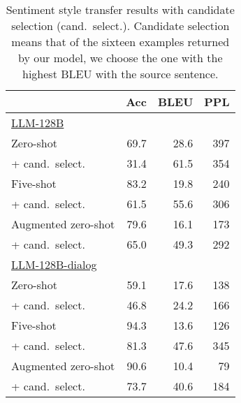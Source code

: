 
\begin{table}
    \centering \small 
        \begin{tabular}{l r r r}
        \toprule
         & Acc & BLEU & PPL\\
        \midrule
        \underline{LLM-128B} \\
        Zero-shot & 69.7 & 28.6 & 397 \\
        + cand.~select. & 31.4 & 61.5 & 354\\
        Five-shot & 83.2 & 19.8 & 240\\
        + cand.~select. & 61.5 & 55.6 & 306\\
        Augmented zero-shot & 79.6 & 16.1 & 173\\
        + cand.~select. & 65.0 & 49.3 & 292\\
        \midrule
        \underline{LLM-128B-dialog} \\
        Zero-shot & 59.1 & 17.6 & 138\\
        + cand.~select. & 46.8 & 24.2 & 166\\
        Five-shot & 94.3 & 13.6 & 126\\
        + cand.~select. & 81.3 & 47.6 & 345\\
        Augmented zero-shot & 90.6 & 10.4 & 79\\
        + cand.~select. & 73.7 & 40.6 & 184\\
        \bottomrule
        \end{tabular}
\caption{
Sentiment style transfer results with candidate selection (cand.~select.). 
Candidate selection means that of the sixteen examples returned by our model, we choose the one with the highest BLEU with the source sentence.  
}
\label{tab:candidate_select}
\end{table}